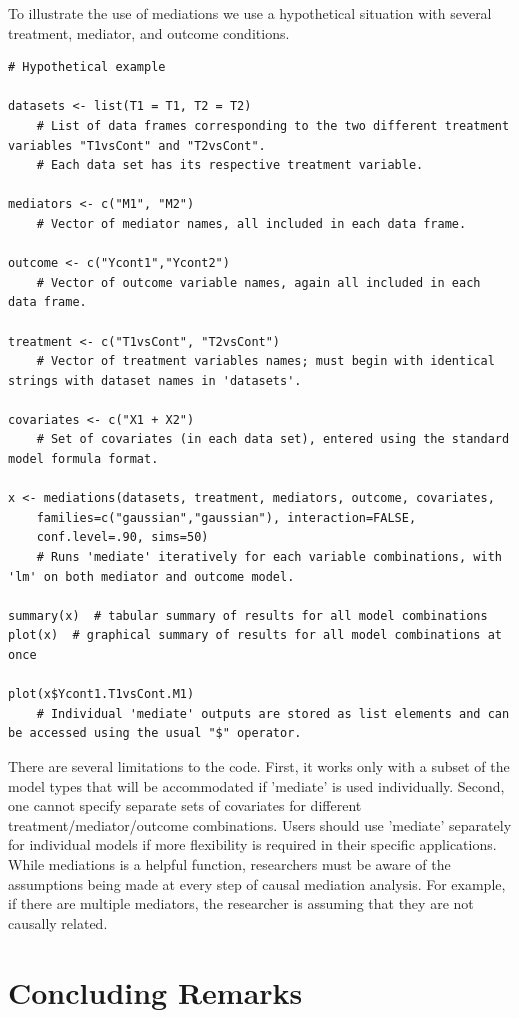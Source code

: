 \documentclass[11pt,letterpaper]{article}
\theoremstyle{plain}
\begin{document}
To illustrate the use of mediations we use a hypothetical situation with several treatment, mediator, and outcome conditions.

\begin{verbatim}
# Hypothetical example

datasets <- list(T1 = T1, T2 = T2)
    # List of data frames corresponding to the two different treatment variables "T1vsCont" and "T2vsCont".
    # Each data set has its respective treatment variable.

mediators <- c("M1", "M2")
    # Vector of mediator names, all included in each data frame.

outcome <- c("Ycont1","Ycont2")
    # Vector of outcome variable names, again all included in each data frame.

treatment <- c("T1vsCont", "T2vsCont")
    # Vector of treatment variables names; must begin with identical strings with dataset names in 'datasets'.

covariates <- c("X1 + X2")
    # Set of covariates (in each data set), entered using the standard model formula format.

x <- mediations(datasets, treatment, mediators, outcome, covariates,
    families=c("gaussian","gaussian"), interaction=FALSE,
    conf.level=.90, sims=50)
    # Runs 'mediate' iteratively for each variable combinations, with 'lm' on both mediator and outcome model.

summary(x)  # tabular summary of results for all model combinations
plot(x)  # graphical summary of results for all model combinations at once

plot(x$Ycont1.T1vsCont.M1)
    # Individual 'mediate' outputs are stored as list elements and can be accessed using the usual "$" operator.
\end{verbatim}

There are several limitations to the code. First, it works only with a subset of the model types that will be accommodated if 'mediate' is used individually. Second, one cannot specify separate sets of covariates for different treatment/mediator/outcome combinations. Users should use 'mediate' separately for individual models if more flexibility is required in their specific applications. While mediations is a helpful function, researchers must be aware of the assumptions being made at every step of causal mediation analysis. For example, if there are multiple mediators, the researcher is assuming that they are not causally related.


\section{Concluding Remarks}
\end{document}
